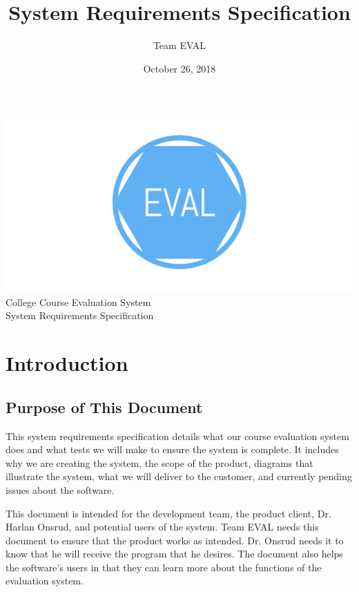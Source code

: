\documentclass{article}
\title{System Requirements Specification}
\author{Team EVAL}
\date{October 26, 2018}
\begin{document}
\maketitle

\newpage

\begin{center}
{\includegraphics[scale=.3]{team_logo.png}}\\ \bigskip
{\LARGE College Course Evaluation System }\\ \medskip
{\large System Requirements Specification }\\ \medskip
\end{center}

\tableofcontents

\newpage

\section{Introduction}
\subsection{Purpose of This Document}

This system requirements specification details what our course evaluation system does and what tests we will make to ensure the system is complete. It includes why we are creating the system, the scope of the product, diagrams that illustrate the system, what we will deliver to the customer, and currently pending issues about the software.

This document is intended for the development team, the product client, Dr. Harlan Onsrud, and potential users of the system. Team EVAL needs this document to ensure that the product works as intended. Dr. Onsrud needs it to know that he will receive the program that he desires. The document also helps the software's users in that they can learn more about the functions of the evaluation system.
\end{document}
